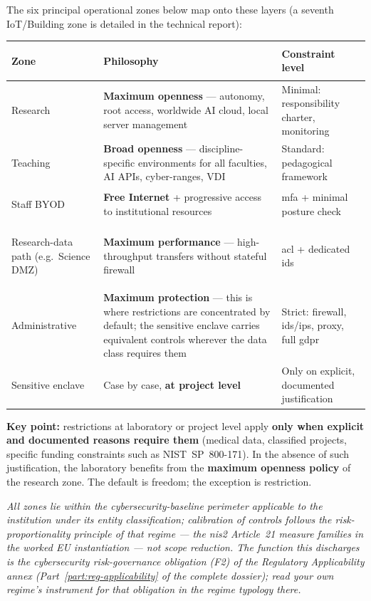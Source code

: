 The six principal operational zones below map onto these layers
(a seventh IoT/Building zone is detailed in the technical report):

\begin{table}[h!]
\centering\small
\renewcommand{\arraystretch}{1.15}
\begin{tabularx}{\textwidth}{
  >{\bfseries\raggedright\arraybackslash}p{2.9cm}
  >{\raggedright\arraybackslash}X
  >{\raggedright\arraybackslash}p{4.2cm}}
\toprule
\textbf{Zone} & \textbf{Philosophy} & \textbf{Constraint level} \\
\midrule
Research &
  \textbf{Maximum openness} --- autonomy, root access, worldwide AI cloud,
  local server management &
  Minimal: responsibility charter, monitoring \\
\addlinespace
Teaching &
  \textbf{Broad openness} --- discipline-specific environments
  for all faculties, AI APIs, cyber-ranges, VDI &
  Standard: pedagogical framework \\
\addlinespace
Staff BYOD &
  \textbf{Free Internet} + progressive access to institutional resources &
  \gls{mfa} + minimal posture check \\
\addlinespace
Research-data path (e.g.\ Science DMZ) &
  \textbf{Maximum performance} --- high-throughput transfers without
  stateful firewall &
  \gls{acl} + dedicated \gls{ids} \\
\addlinespace
Administrative &
  \textbf{Maximum protection} --- this is where restrictions are
  concentrated by default; the sensitive enclave carries equivalent
  controls wherever the data class requires them &
  Strict: firewall, \gls{ids}/\gls{ips}, proxy, full \gls{gdpr} \\
\addlinespace
Sensitive enclave &
  Case by case, \textbf{at project level} &
  Only on explicit, documented justification \\
\bottomrule
\end{tabularx}
\end{table}

\noindent\textbf{Key point:} restrictions at laboratory or project level apply
\textbf{only when explicit and documented reasons require them} (medical data,
classified projects, specific funding constraints such as NIST~SP~800-171). In
the absence of such justification, the laboratory benefits from the \textbf{maximum
openness policy} of the research zone. The default is freedom; the exception is
restriction.

\smallskip
\noindent\emph{All zones lie within the cybersecurity-baseline perimeter
applicable to the institution under its entity classification; calibration of
controls follows the risk-proportionality principle of that regime --- the
\gls{nis2} Article~21 measure families in the worked EU instantiation --- not
scope reduction. The function this discharges is the cybersecurity
risk-governance obligation (F2) of the Regulatory Applicability annex
(Part~\ref{part:reg-applicability} of the complete dossier); read your own regime's instrument for
that obligation in the regime typology there.}

